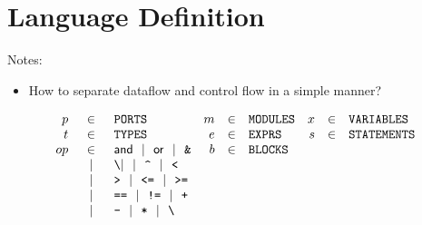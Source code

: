 \documentclass[10pt]{article}
\newcommand{\alt}{~~|~~}
\newcommand{\andop}        {\mathsf{and}}
\newcommand{\orop}         {\mathsf{or}}
\begin{document}
\section{Language Definition}

Notes:
\begin{itemize}
	\item How to separate dataflow and control flow in a simple manner?
\end{itemize}

\[
	\begin{array}{rclrclrcl}
		p  & \in  & \verb|PORTS|                           & m & \in & \verb|MODULES| & x & \in & \verb|VARIABLES|  \\
		t  & \in  & \verb|TYPES|                           & e & \in & \verb|EXPRS|   & s & \in & \verb|STATEMENTS| \\
		op & \in  & \andop \alt \orop \alt \verb|&|        & b & \in & \verb|BLOCKS|  &   &     &                   \\
		   & \alt & \verb|\|| \alt \verb|^| \alt \verb|<|  &   &     &                &   &                         \\
		   & \alt & \verb|>| \alt \verb|<=| \alt \verb|>=| &   &     &                &   &                         \\
		   & \alt & \verb|==| \alt \verb|!=| \alt \verb|+| &   &     &                &   &                         \\
		   & \alt & \verb|-| \alt \verb|*|  \alt \verb|\|  &   &     &                &   &                         \\
	\end{array}
\]
\end{document}
